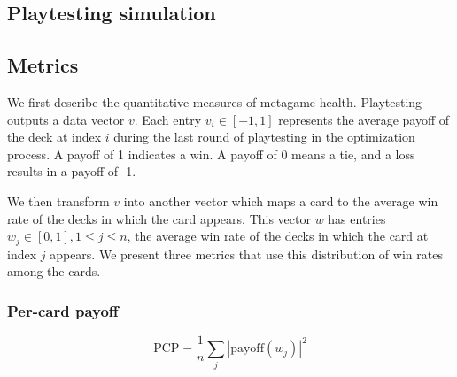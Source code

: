 
\subsection{Playtesting simulation}



\subsection{Metrics}

We first describe the quantitative measures of metagame health. 
Playtesting outputs a data vector $v$.
Each entry $v_i \in [-1, 1]$ represents the average payoff of
the deck at index $i$ during the last round of playtesting in
the optimization process. A payoff of 1 indicates a win. A
payoff of 0 means a tie, and a loss results in a payoff of -1.

We then transform $v$ into another vector which maps a card to the
average win rate of the decks in which the card appears. This
vector $w$ has entries
$w_j \in [0, 1], 1 \leq j \leq n$, the average win rate of the decks in which
the card at index $j$ appears. We present three metrics that 
use this distribution of win rates among the cards.


\subsubsection{Per-card payoff}

\begin{equation}
	\mathrm{PCP} = \frac{1}{n} \sum_j \left|\mathrm{payoff}(w_j)\right|^2
\end{equation}

